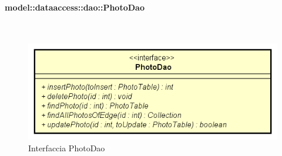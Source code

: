 \documentclass[../DefinizioneDiProdotto.tex]{subfiles}
\begin{document}
\paragraph{model::dataaccess::dao::PhotoDao}
\
\begin{figure}[H]
	\centering
	\includegraphics[width=\maxwidth]{img/PhotoDao.png}
	\caption{Interfaccia PhotoDao}\label{fig:model::dataaccess::dao::PhotoDao} 
\end{figure}
\end{document}
